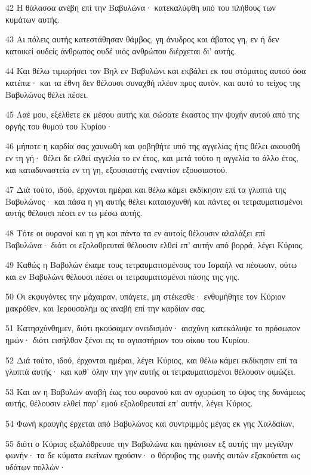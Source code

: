 \par 42 Η θάλασσα ανέβη επί την Βαβυλώνα· κατεκαλύφθη υπό του πλήθους των κυμάτων αυτής.
\par 43 Αι πόλεις αυτής κατεστάθησαν θάμβος, γη άνυδρος και άβατος γη, εν ή δεν κατοικεί ουδείς άνθρωπος ουδέ υιός ανθρώπου διέρχεται δι' αυτής.
\par 44 Και θέλω τιμωρήσει τον Βηλ εν Βαβυλώνι και εκβάλει εκ του στόματος αυτού όσα κατέπιε· και τα έθνη δεν θέλουσι συναχθή πλέον προς αυτόν, και αυτό το τείχος της Βαβυλώνος θέλει πέσει.
\par 45 Λαέ μου, εξέλθετε εκ μέσου αυτής και σώσατε έκαστος την ψυχήν αυτού από της οργής του θυμού του Κυρίου·
\par 46 μήποτε η καρδία σας χαυνωθή και φοβηθήτε υπό της αγγελίας ήτις θέλει ακουσθή εν τη γή· θέλει δε ελθεί αγγελία το εν έτος, και μετά τούτο η αγγελία το άλλο έτος, και καταδυναστεία εν τη γη, εξουσιαστής εναντίον εξουσιαστού.
\par 47 Διά τούτο, ιδού, έρχονται ημέραι και θέλω κάμει εκδίκησιν επί τα γλυπτά της Βαβυλώνος· και πάσα η γη αυτής θέλει καταισχυνθή και πάντες οι τετραυματισμένοι αυτής θέλουσι πέσει εν τω μέσω αυτής.
\par 48 Τότε οι ουρανοί και η γη και πάντα τα εν αυτοίς θέλουσιν αλαλάξει επί Βαβυλώνα· διότι οι εξολοθρευταί θέλουσιν ελθεί επ' αυτήν από βορρά, λέγει Κύριος.
\par 49 Καθώς η Βαβυλών έκαμε τους τετραυματισμένους του Ισραήλ να πέσωσιν, ούτω και εν Βαβυλώνι θέλουσι πέσει οι τετραυματισμένοι πάσης της γης.
\par 50 Οι εκφυγόντες την μάχαιραν, υπάγετε, μη στέκεσθε· ενθυμήθητε τον Κύριον μακρόθεν, και Ιερουσαλήμ ας αναβή επί την καρδίαν σας.
\par 51 Κατησχύνθημεν, διότι ηκούσαμεν ονειδισμόν· αισχύνη κατεκάλυψε το πρόσωπον ημών· διότι εισήλθον ξένοι εις το αγιαστήριον του οίκου του Κυρίου.
\par 52 Διά τούτο, ιδού, έρχονται ημέραι, λέγει Κύριος, και θέλω κάμει εκδίκησιν επί τα γλυπτά αυτής· και καθ' όλην την γην αυτής οι τετραυματισμένοι θέλουσιν οιμώζει.
\par 53 Και αν η Βαβυλών αναβή έως του ουρανού και αν οχυρώση το ύψος της δυνάμεως αυτής, θέλουσιν ελθεί παρ' εμού εξολοθρευταί επ' αυτήν, λέγει Κύριος.
\par 54 Φωνή κραυγής έρχεται από Βαβυλώνος και συντριμμός μέγας εκ γης Χαλδαίων,
\par 55 διότι ο Κύριος εξωλόθρευσε την Βαβυλώνα και ηφάνισεν εξ αυτής την μεγάλην φωνήν· τα δε κύματα εκείνων ηχούσιν· ο θόρυβος της φωνής αυτών εξακούεται ως υδάτων πολλών·
